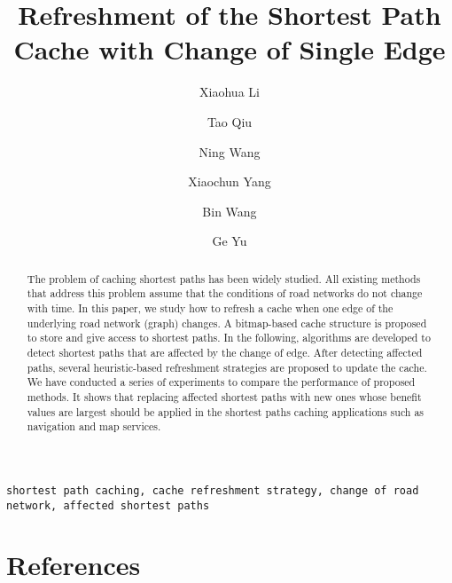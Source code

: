 \documentclass[review]{elsarticle}
\begin{document}
\begin{frontmatter}

\title{Refreshment of the Shortest Path Cache with Change of Single Edge}

\author[address1]{Xiaohua Li}
\author[address1]{Tao Qiu}
\author[address2]{Ning Wang}
\author[address1]{Xiaochun Yang}
\author[address1]{Bin Wang}
\author[address1]{Ge Yu}
\address[address1]{School of Computer Science and Engineering, Northeastern University, Liaoning, China}

\address[address2]{Department of Information Management, School of Management, Shanghai University, Shanghai, China}




\begin{abstract}
The problem of caching shortest paths has been widely studied.
All existing methods that address this problem assume that the conditions of road networks do not change with time.
In this paper, we study how to refresh a cache when one edge of the underlying road network (graph) changes. A bitmap-based cache structure is proposed to store and give access to shortest paths. In the following, algorithms are developed to detect shortest paths that are affected by the change of edge. After detecting affected paths, several heuristic-based refreshment strategies are proposed to update the cache. We have conducted a series of experiments to compare the performance of proposed methods. It shows that replacing affected shortest paths with new ones whose benefit values are largest should be applied in the shortest paths caching applications such as navigation and map services.
\end{abstract}

\begin{keyword}
\texttt{shortest path caching, cache refreshment strategy, change of road network, affected shortest paths}
\end{keyword}

\end{frontmatter}

\linenumbers


%





\section*{References}

\end{document}
